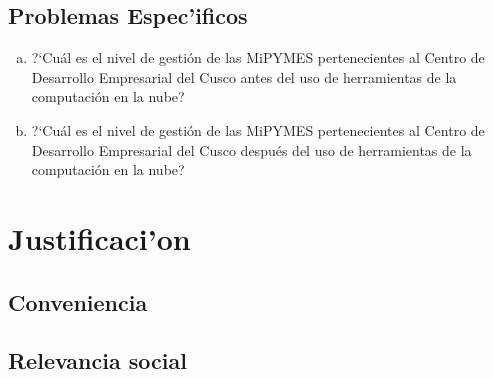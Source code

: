 \subsection{Problemas Espec'ificos}
\begin{enumerate}[a.]
\item ?`Cu\'al es el nivel de gesti\'on de las MiPYMES pertenecientes al Centro
de Desarrollo Empresarial del Cusco antes del uso de herramientas de la computaci\'on
en la nube?
\item ?`Cu\'al es el nivel de gesti\'on de las MiPYMES pertenecientes al Centro
de Desarrollo Empresarial del Cusco despu\'es del uso de herramientas de la computaci\'on
en la nube?
\end{enumerate}
%
%
\section{Justificaci'on}
\subsection{Conveniencia}

\subsection{Relevancia social}


